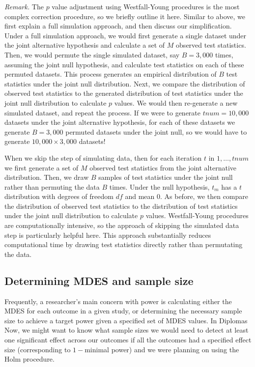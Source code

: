 \documentclass[
]{jss}
\begin{document}
\emph{Remark.} The \(p\) value adjustment using Westfall-Young
procedures is the most complex correction procedure, so we briefly
outline it here. Similar to above, we first explain a full simulation
approach, and then discuss our simplification. Under a full simulation
approach, we would first generate a single dataset under the joint
alternative hypothesis and calculate a set of \(M\) observed test
statistics. Then, we would permute the single simulated dataset, say
\(B = 3,000\) times, assuming the joint null hypothesis, and calculate
test statistics on each of these permuted datasets. This process
generates an empirical distribution of \(B\) test statistics under the
joint null distribution. Next, we compare the distribution of observed
test statistics to the generated distribution of test statistics under
the joint null distribution to calculate \(p\) values. We would then
re-generate a new simulated dataset, and repeat the process. If we were
to generate \(tnum = 10,000\) datasets under the joint alternative
hypothesis, for each of these datasets we generate \(B = 3,000\)
permuted datasets under the joint null, so we would have to generate
\(10,000 \times 3,000\) datasets!

When we skip the step of simulating data, then for each iteration \(t\)
in \(1, \dots, tnum\) we first generate a set of \(M\) observed test
statistics from the joint alternative distribution. Then, we draw \(B\)
samples of test statistics under the joint null rather than permuting
the data \(B\) times. Under the null hypothesis, \(t_m\) has a \(t\)
distribution with degrees of freedom \(df\) and mean \(0\). As before,
we then compare the distribution of observed test statistics to the
distribution of test statistics under the joint null distribution to
calculate \(p\) values. Westfall-Young procedures are computationally
intensive, so the approach of skipping the simulated data step is
particularly helpful here. This approach substantially reduces
computational time by drawing test statistics directly rather than
permutating the data.

\subsection{Determining MDES and sample size}
\label{sec:est_mdes_ss}

Frequently, a researcher's main concern with power is calculating either
the MDES for each outcome in a given study, or determining the necessary
sample size to achieve a target power given a specified set of MDES
values. In Diplomas Now, we might want to know what sample sizes we
would need to detect at least one significant effect across our outcomes
if all the outcomes had a specified effect size (corresponding to
\(1-\)minimal power) and we were planning on using the Holm procedure.
\end{document}
